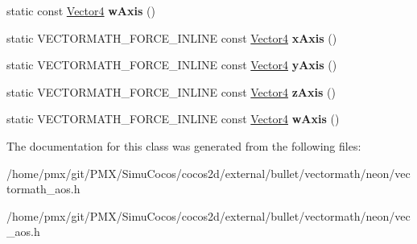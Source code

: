 \begin{DoxyCompactItemize}
static const \hyperlink{classVectormath_1_1Aos_1_1Vector4}{Vector4} {\bfseries w\+Axis} ()
\item 
\mbox{\label{classVectormath_1_1Aos_1_1Vector4_a09a8676490aaec4e55f7dba565e80a2e}} 
static V\+E\+C\+T\+O\+R\+M\+A\+T\+H\+\_\+\+F\+O\+R\+C\+E\+\_\+\+I\+N\+L\+I\+NE const \hyperlink{classVectormath_1_1Aos_1_1Vector4}{Vector4} {\bfseries x\+Axis} ()
\item 
\mbox{\label{classVectormath_1_1Aos_1_1Vector4_a68b1ac02f902acde484477097984c4a6}} 
static V\+E\+C\+T\+O\+R\+M\+A\+T\+H\+\_\+\+F\+O\+R\+C\+E\+\_\+\+I\+N\+L\+I\+NE const \hyperlink{classVectormath_1_1Aos_1_1Vector4}{Vector4} {\bfseries y\+Axis} ()
\item 
\mbox{\label{classVectormath_1_1Aos_1_1Vector4_ad6a013a14fadcd7ec9ef877c144199ef}} 
static V\+E\+C\+T\+O\+R\+M\+A\+T\+H\+\_\+\+F\+O\+R\+C\+E\+\_\+\+I\+N\+L\+I\+NE const \hyperlink{classVectormath_1_1Aos_1_1Vector4}{Vector4} {\bfseries z\+Axis} ()
\item 
\mbox{\label{classVectormath_1_1Aos_1_1Vector4_a7f637835f97bf181c3b6ced0ac122593}} 
static V\+E\+C\+T\+O\+R\+M\+A\+T\+H\+\_\+\+F\+O\+R\+C\+E\+\_\+\+I\+N\+L\+I\+NE const \hyperlink{classVectormath_1_1Aos_1_1Vector4}{Vector4} {\bfseries w\+Axis} ()
\end{DoxyCompactItemize}


The documentation for this class was generated from the following files\+:\begin{DoxyCompactItemize}
\item 
/home/pmx/git/\+P\+M\+X/\+Simu\+Cocos/cocos2d/external/bullet/vectormath/neon/vectormath\+\_\+aos.\+h\item 
/home/pmx/git/\+P\+M\+X/\+Simu\+Cocos/cocos2d/external/bullet/vectormath/neon/vec\+\_\+aos.\+h\end{DoxyCompactItemize}
